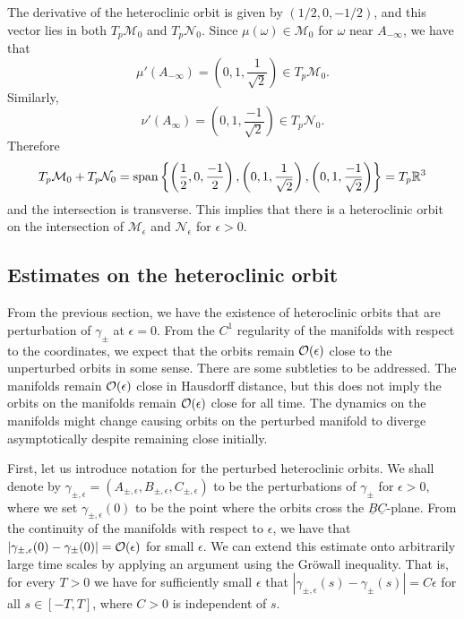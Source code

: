 The derivative of the heteroclinic orbit is given by \((1/2, 0, -1/2)\), and this vector lies in both \(T_p\mathcal M_0\) and \(T_p \mathcal N_0\). Since \(\mu(\omega) \in \mathcal M_0\) for \(\omega\) near \(A_{-\infty}\), we have that 
\begin{equation}
	\mu'(A_{-\infty}) = \left( 0, 1, \frac  1 {\sqrt 2} \right) \in T_p \mathcal M_0.
\end{equation}
Similarly,
\begin{equation}
	\nu'(A_{\infty}) = \left( 0, 1, \frac  {-1} {\sqrt 2} \right) \in T_p \mathcal N_0.
\end{equation}
Therefore
\begin{equation}
	T_p \mathcal M_0 + T_p \mathcal N_0 = \mathrm{span} \left\{ \left(\frac 1 2 , 0, \frac{-1} 2\right),  \left( 0, 1, \frac  1 {\sqrt 2} \right) ,  \left( 0, 1, \frac  {-1} {\sqrt 2} \right) \right\} = T_p\mathbb{R}^3
\end{equation}
and the intersection is transverse. This implies that there is a heteroclinic orbit on the intersection of \(\mathcal M_\epsilon\) and \(\mathcal N_\epsilon\) for \(\epsilon > 0\). 

\subsection{Estimates on the heteroclinic orbit}

From the previous section, we have the existence of heteroclinic orbits that are perturbation of \(\gamma_\pm\) at \(\epsilon = 0\). From the \(C^1\) regularity of the manifolds with respect to the coordinates, we expect that the orbits remain \(\mathcal{O}(\epsilon)\) close to the unperturbed orbits in some sense. There are some subtleties to be addressed. The manifolds remain \(\mathcal{O}(\epsilon)\) close in Hausdorff distance, but this does not imply the orbits on the manifolds remain \(\mathcal{O}(\epsilon)\) close for all time. The dynamics on the manifolds might change causing orbits on the perturbed manifold to diverge asymptotically despite remaining close initially.

First, let us introduce notation for the perturbed heteroclinic orbits. We shall denote by \(\gamma_{\pm, \epsilon} = (A_{\pm, \epsilon} , B_{\pm, \epsilon}, C_{\pm,\epsilon})\) to be the perturbations of \(\gamma_{\pm}\) for \(\epsilon > 0\), where we set \(\gamma_{\pm,\epsilon}(0)\) to be the point where the orbits cross the \(\underline{B}\underline{C}\)-plane. From the continuity of the manifolds with respect to \(\epsilon\), we have that \(|\gamma_{\pm, \epsilon}(0) - \gamma_\pm(0)| = \mathcal{O}(\epsilon)\) for small \(\epsilon\). We can extend this estimate onto arbitrarily large time scales by applying an argument using the Gr\"owall inequality. That is, for every \(T> 0\) we have for sufficiently small \(\epsilon\) that \(|\gamma_{\pm, \epsilon}(s) - \gamma_\pm(s)| = C\epsilon\) for all \(s\in[-T,T]\), where \(C>0\) is independent of \(s\). 

